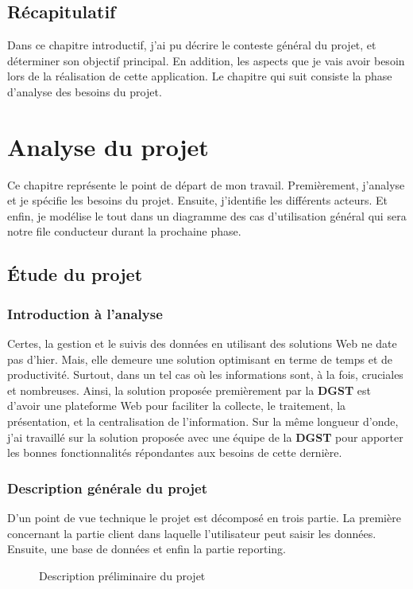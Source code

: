\documentclass[a4paper]{report}
\begin{document}
\begin{doublespace}
	\section{Récapitulatif}
	Dans ce chapitre introductif, j'ai pu décrire le conteste général du
	projet, et
	déterminer son objectif principal. En addition, les aspects que je vais
	avoir besoin lors de la réalisation de cette application.
	Le chapitre qui suit consiste la phase d'analyse des besoins du projet.
	\newpage
	\chapter{Analyse du projet}
	\renewcommand{\headrulewidth}{1pt}
	\fancyhead[L]{\hspace*{5cm}}

	Ce chapitre représente le point de départ de mon travail. Premièrement,
	j'analyse et
	je spécifie les besoins du projet. Ensuite, j'identifie les différents
	acteurs. Et enfin, je
	modélise le tout dans un diagramme des cas d’utilisation général qui
	sera notre file conducteur
	durant la prochaine phase.
	\section{Étude du projet}
	\subsection{Introduction à l'analyse}
	Certes, la gestion et le suivis des données en utilisant des solutions
	Web ne date pas d'hier. Mais,
	elle demeure une solution optimisant en terme de temps et de
	productivité. Surtout,
	dans un tel cas où les informations sont, à la fois, cruciales et
	nombreuses. Ainsi, la solution proposée premièrement par la \textbf{DGST} est
	d'avoir une plateforme Web pour faciliter la collecte,
	le traitement, la présentation, et la centralisation de l'information.
	Sur la même longueur d'onde, j'ai
	travaillé sur la solution proposée avec une équipe de la \textbf{DGST}
	pour apporter les bonnes
	fonctionnalités répondantes aux besoins de cette dernière.
	\subsection{Description générale du projet}
	D'un point de vue technique le projet est décomposé en trois partie. La
	première concernant la partie client dans laquelle l'utilisateur peut saisir
	les données. Ensuite, une base de données et enfin la partie reporting.
	\begin{figure}[H]
		\begin{center}
			\caption{Description préliminaire du projet}
		\end{center}
	\end{figure}

\end{doublespace}
\end{document}
